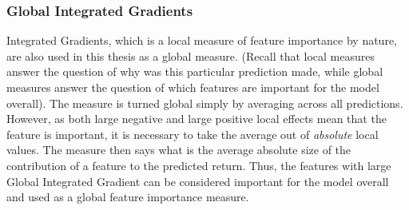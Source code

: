 		\subsubsection{Global Integrated Gradients}
			Integrated Gradients, which is a local measure of feature importance by nature, are also used in this thesis as a global measure. (Recall that local measures answer the question of why was this particular prediction made, while global measures answer the question of which features are important for the model overall). The measure is turned global simply by averaging across all predictions. However, as both large negative and large positive local effects mean that the feature is important, it is necessary to take the average out of \textit{absolute} local values. The measure then says what is the average absolute size of the contribution of a feature to the predicted return. Thus, the features with large Global Integrated Gradient can be considered important for the model overall and used as a global feature importance measure.   
			
			
			
		
	
		  
	
	
	
	
	
	
	
	
	
	
	
	
	
	